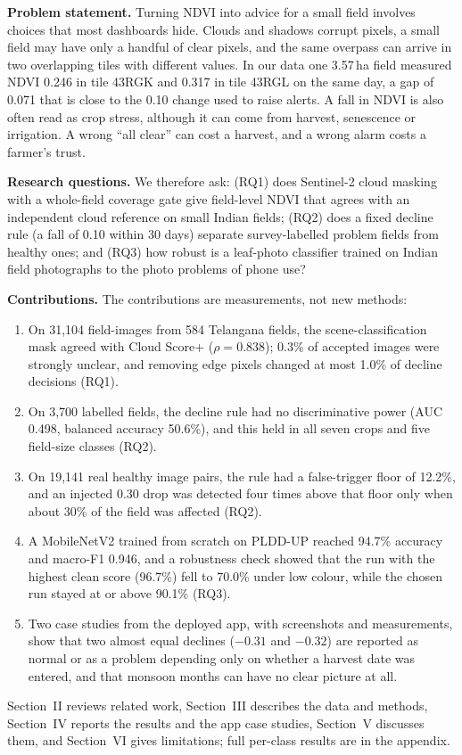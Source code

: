 \documentclass[conference]{IEEEtran}
\begin{document}
\textbf{Problem statement.} Turning NDVI into advice for a small field involves choices that most dashboards hide. Clouds and shadows corrupt pixels, a small field may have only a handful of clear pixels, and the same overpass can arrive in two overlapping tiles with different values. In our data one 3.57\,ha field measured NDVI 0.246 in tile 43RGK and 0.317 in tile 43RGL on the same day, a gap of 0.071 that is close to the 0.10 change used to raise alerts. A fall in NDVI is also often read as crop stress, although it can come from harvest, senescence or irrigation. A wrong ``all clear'' can cost a harvest, and a wrong alarm costs a farmer's trust.

\textbf{Research questions.} We therefore ask: (RQ1) does Sentinel-2 cloud masking with a whole-field coverage gate give field-level NDVI that agrees with an independent cloud reference on small Indian fields; (RQ2) does a fixed decline rule (a fall of 0.10 within 30 days) separate survey-labelled problem fields from healthy ones; and (RQ3) how robust is a leaf-photo classifier trained on Indian field photographs to the photo problems of phone use?

\textbf{Contributions.} The contributions are measurements, not new methods:
\begin{enumerate}
\renewcommand{\labelenumi}{(\roman{enumi})}
\item On 31,104 field-images from 584 Telangana fields, the scene-classification mask agreed with Cloud Score+ ($\rho = 0.838$); 0.3\% of accepted images were strongly unclear, and removing edge pixels changed at most 1.0\% of decline decisions (RQ1).
\item On 3,700 labelled fields, the decline rule had no discriminative power (AUC 0.498, balanced accuracy 50.6\%), and this held in all seven crops and five field-size classes (RQ2).
\item On 19,141 real healthy image pairs, the rule had a false-trigger floor of 12.2\%, and an injected 0.30 drop was detected four times above that floor only when about 30\% of the field was affected (RQ2).
\item A MobileNetV2 trained from scratch on PLDD-UP reached 94.7\% accuracy and macro-F1 0.946, and a robustness check showed that the run with the highest clean score (96.7\%) fell to 70.0\% under low colour, while the chosen run stayed at or above 90.1\% (RQ3).
\item Two case studies from the deployed app, with screenshots and measurements, show that two almost equal declines ($-0.31$ and $-0.32$) are reported as normal or as a problem depending only on whether a harvest date was entered, and that monsoon months can have no clear picture at all.
\end{enumerate}
Section~II reviews related work, Section~III describes the data and methods, Section~IV reports the results and the app case studies, Section~V discusses them, and Section~VI gives limitations; full per-class results are in the appendix.
\end{document}
